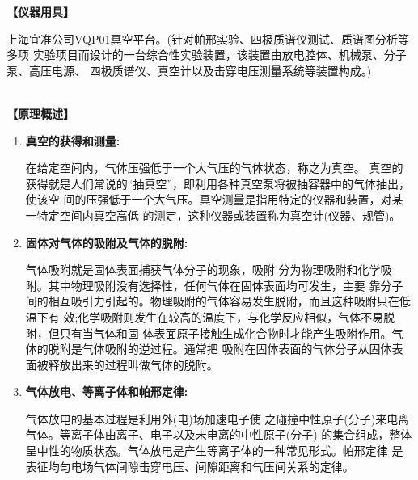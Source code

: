 \documentclass[11pt,a4paper]{ctexart}
\newcommand{\emptyline}{\par \ }
\begin{document}
\textbf{【仪器用具】}\par
上海宜准公司VQP01真空平台。(针对帕邢实验、四极质谱仪测试、质谱图分析等多项 实验项目而设计的一台综合性实验装置，该装置由放电腔体、机械泵、分子泵、高压电源、 四极质谱仪、真空计以及击穿电压测量系统等装置构成。)\cite{lec,att2}
\emptyline
\\
\textbf{【原理概述】}\par
\begin{enumerate}
\item \textbf{真空的获得和测量:}\par
在给定空间内，气体压强低于一个大气压的气体状态，称之为真空。 真空的获得就是人们常说的“抽真空”，即利用各种真空泵将被抽容器中的气体抽出，使该空 间的压强低于一个大气压。真空测量是指用特定的仪器和装置，对某一特定空间内真空高低 的测定，这种仪器或装置称为真空计(仪器、规管)。\cite{att1}
\item \textbf{固体对气体的吸附及气体的脱附:}\par
气体吸附就是固体表面捕获气体分子的现象，吸附 分为物理吸附和化学吸附。其中物理吸附没有选择性，任何气体在固体表面均可发生，主要 靠分子间的相互吸引力引起的。物理吸附的气体容易发生脱附，而且这种吸附只在低温下有 效;化学吸附则发生在较高的温度下，与化学反应相似，气体不易脱附，但只有当气体和固 体表面原子接触生成化合物时才能产生吸附作用。气体的脱附是气体吸附的逆过程。通常把 吸附在固体表面的气体分子从固体表面被释放出来的过程叫做气体的脱附。

\item \textbf{气体放电、等离子体和帕邢定律:}\par
气体放电的基本过程是利用外(电)场加速电子使 之碰撞中性原子(分子)来电离气体。等离子体由离子、电子以及未电离的中性原子(分子) 的集合组成，整体呈中性的物质状态。气体放电是产生等离子体的一种常见形式。帕邢定律 是表征均匀电场气体间隙击穿电压、间隙距离和气压间关系的定律。\cite{att3}


\end{enumerate}
\end{document}

